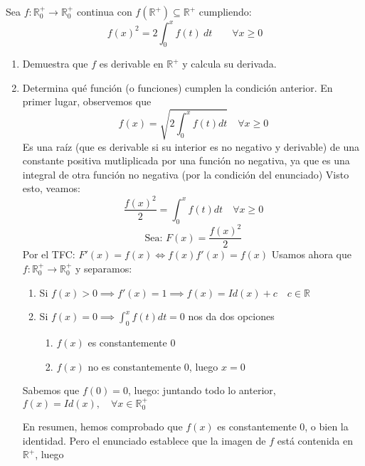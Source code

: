 \documentclass[12pt]{article}
\begin{document}
    \begin{ejercicio}
        Sea $f:\mathbb{R}^+_0\longrightarrow\mathbb{R}^+_0$ continua con $f(\mathbb{R}^+) \subseteq \mathbb{R}^+$ cumpliendo:
        \begin{equation*}
            f(x)^2 = 2\int_{0}^{x} f(t)~dt \qquad \forall x\geq 0
        \end{equation*}
        \begin{enumerate}[label=\alph*)]
            \item Demuestra que $f$ es derivable en $\mathbb{R}^+$ y calcula su derivada.
            \item Determina qué función (o funciones) cumplen la condición anterior.
            En primer lugar, observemos que $$f(x) = \sqrt{2\int_0^xf(t)dt} \quad \forall x \geq0$$
            Es una raíz (que es derivable si su interior es no negativo y derivable) de una constante positiva mutliplicada por una función no negativa, ya que es una integral de otra función no negativa (por la condición del enunciado)
            Visto esto, veamos:
            $$\frac{f(x)^2}{2} = \int_0^xf(t)dt \quad \forall x \geq0 $$ $$\text{Sea: } F(x)= \frac{f(x)^2}{2}$$
            Por el TFC: $F'(x) = f(x) \iff f(x) f'(x) = f(x)$
            Usamos ahora que $f:\mathbb{R}^+_0\longrightarrow\mathbb{R}^+_0$ y separamos:
            \begin{enumerate}
                \item Si $f(x) > 0 \implies f'(x) = 1 \implies f(x) = Id(x)+c \quad c\in \mathbb{R}$
                \item Si $f(x) = 0 \implies \int_0^xf(t)dt = 0$ nos da dos opciones \begin{enumerate}
                    \item $f(x)$ es constantemente 0
                    \item $f(x)$ no es constantemente 0, luego $x=0$
                \end{enumerate}
                
            \end{enumerate}
             Sabemos que $f(0) = 0 $, luego:
            \newline juntando todo lo anterior, $f(x) = Id(x), \quad  \forall x \in \mathbb{R}_0^+$

            En resumen, hemos comprobado que $f(x)$ es constantemente $0$, o bien la identidad. Pero el enunciado establece que la imagen de $f$ está contenida en $\mathbb{R}^+$, luego 
            

        \end{enumerate}
    \end{ejercicio}
\end{document}
